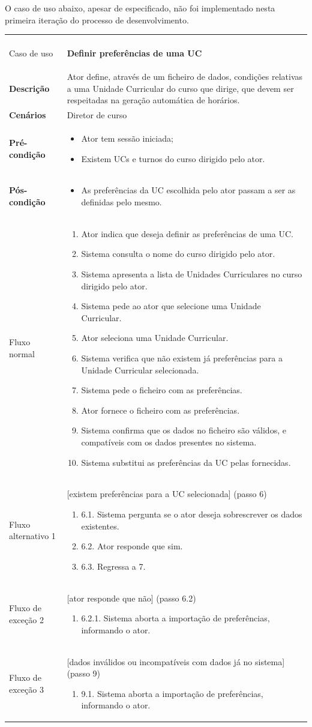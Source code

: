 \documentclass[12pt, a4paper]{article}
\newenvironment{condition}{
    \begin{itemize}[wide=0pt]
        \vspace{-0.2cm}
}{
        \vspace{-0.5cm}
    \end{itemize}
}
\newcommand\flow[1]{
    Fluxo normal &
    \vspace{-0.9cm}
    \singlespacing
    \begin{enumerate}[wide=0pt]
        #1
        \vspace{-0.3cm}
    \end{enumerate} \\ \hline
}
\newcommand\otherflow[3]{
    #1 &
    #2
    \singlespacing
    \begin{enumerate}[wide=0pt]
        #3
        \vspace{-0.3cm}
    \end{enumerate} \\ \hline
}
\newenvironment{usecase}[5]{
    \begin{longtable}{|>{\centering\arraybackslash\bf}m{3cm}|m{13cm}|}
        \multicolumn{2}{c}{\ldots Continua \ldots} \\
        \endfoot
        \endlastfoot

        \hline
        Caso de uso & \textbf{#1} \\

        \hline
        Descrição & #2 \\

        \hline
        Cenários & #3 \\

        \hline
        Pré-condição &
        \vspace{-0.8cm}
        \begin{condition}
            #4
        \end{condition} \\

        \hline
        Pós-condição &
        \vspace{-0.8cm}
        \begin{condition}
            #5
        \end{condition} \\

        \hline
}{
\end{longtable}
}
\begin{document}
O caso de uso abaixo, apesar de especificado, não foi implementado nesta primeira iteração do
processo de desenvolvimento.

\begin{usecase}
    {Definir preferências de uma UC}
    {
        Ator define, através de um ficheiro de dados, condições relativas a uma Unidade Curricular
        do curso que dirige, que devem ser respeitadas na geração automática de horários.
    }
    {Diretor de curso}
    {
        \item Ator tem sessão iniciada;
        \item Existem UCs e turnos do curso dirigido pelo ator.
    }
    {\item As preferências da UC escolhida pelo ator passam a ser as definidas pelo mesmo.}

    \flow{
        \item Ator indica que deseja definir as preferências de uma UC.
        \item Sistema consulta o nome do curso dirigido pelo ator.
        \item Sistema apresenta a lista de Unidades Curriculares no curso dirigido pelo ator.
        \item Sistema pede ao ator que selecione uma Unidade Curricular.
        \item Ator seleciona uma Unidade Curricular.
        \item Sistema verifica que não existem já preferências para a Unidade Curricular
            selecionada.
        \item Sistema pede o ficheiro com as preferências.
        \item Ator fornece o ficheiro com as preferências.
        \item Sistema confirma que os dados no ficheiro são válidos, e compatíveis com os dados
            presentes no sistema.
        \item Sistema substitui as preferências da UC pelas fornecidas.
    }

    \otherflow{Fluxo alternativo 1}{[existem preferências para a UC selecionada] (passo 6)}{
        \item[6.1.] Sistema pergunta se o ator deseja sobrescrever os dados existentes.
        \item[6.2.] Ator responde que sim.
        \item[6.3.] Regressa a 7.
    }

    \otherflow{Fluxo de exceção 2}{[ator responde que não] (passo 6.2)}{
        \item[6.2.1.] Sistema aborta a importação de preferências, informando o ator.
    }

    \otherflow{Fluxo de exceção 3}
        {[dados inválidos ou incompatíveis com dados já no sistema] (passo 9)}{

        \item[9.1.] Sistema aborta a importação de preferências, informando o ator.
    }
\end{usecase}
\end{document}
